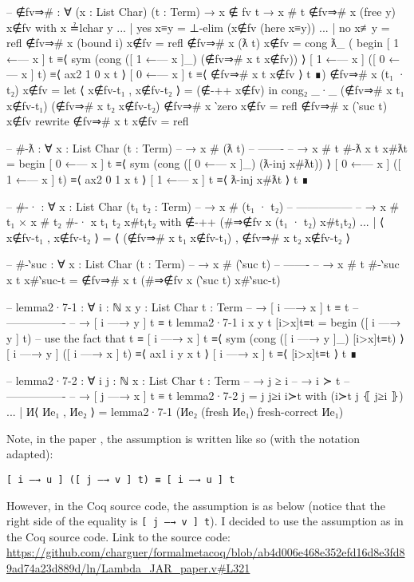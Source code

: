 \documentclass[logo,bsc,singlespacing,parskip,online]{infthesis}
\renewenvironment{code}{\mintedcopy[breaklines,breaksymbolleft=\;]{agda}}{\endmintedcopy}
\begin{document}
\begin{code}
-- ∉fv⇒# : ∀ (x : List Char) (t : Term) → x ∉ fv t → x # t
∉fv⇒# x (free y) x∉fv with x ≟lchar y
... | yes x≡y = ⊥-elim (x∉fv (here x≡y))
... | no  x≢y = refl
∉fv⇒# x (bound i) x∉fv = refl
∉fv⇒# x (ƛ t) x∉fv = cong ƛ_ (
  begin
    [ 1 ←— x ] t
  ≡⟨ sym (cong ([ 1 ←— x ]_) (∉fv⇒# x t x∉fv)) ⟩
    [ 1 ←— x ] ([ 0 ←— x ] t)
  ≡⟨ ax2 1 0 x t ⟩
    [ 0 ←— x ] t
  ≡⟨ ∉fv⇒# x t x∉fv ⟩
    t
  ∎)
∉fv⇒# x (t₁ · t₂) x∉fv = let ⟨ x∉fv-t₁ , x∉fv-t₂ ⟩ = (∉-++ x∉fv) in
  cong₂ _·_
    (∉fv⇒# x t₁ x∉fv-t₁)
    (∉fv⇒# x t₂ x∉fv-t₂)
∉fv⇒# x ‵zero x∉fv = refl
∉fv⇒# x (‵suc t) x∉fv rewrite ∉fv⇒# x t x∉fv = refl

-- #-ƛ : ∀ {x : List Char} (t : Term)
--   → x # (ƛ t)
--     -------
--   → x # t
#-ƛ {x} t x#ƛt =
  begin
    [ 0 ←— x ] t
  ≡⟨ sym (cong ([ 0 ←— x ]_) (ƛ-inj x#ƛt)) ⟩
    [ 0 ←— x ] ([ 1 ←— x ] t)
  ≡⟨ ax2 0 1 x t ⟩
    [ 1 ←— x ] t
  ≡⟨ ƛ-inj x#ƛt ⟩
    t
  ∎

-- #-· : ∀ {x : List Char} (t₁ t₂ : Term)
--   → x # (t₁ · t₂)
--     ---------------
--   → x # t₁ × x # t₂
#-· {x} t₁ t₂ x#t₁t₂ with ∉-++ (#⇒∉fv x (t₁ · t₂) x#t₁t₂)
... | ⟨ x∉fv-t₁ , x∉fv-t₂ ⟩ = ⟨ (∉fv⇒# x t₁ x∉fv-t₁) , ∉fv⇒# x t₂ x∉fv-t₂ ⟩

-- #-‵suc : ∀ {x : List Char} (t : Term)
--   → x # (‵suc t)
--     -------
--   → x # t
#-‵suc {x} t x#‵suc-t = ∉fv⇒# x t (#⇒∉fv x (‵suc t) x#‵suc-t)


-- lemma2·7-1 : ∀ {i : ℕ} {x y : List Char} {t : Term}
--   → [ i —→ x ] t ≡ t
--     ----------------
--   → [ i —→ y ] t ≡ t
lemma2·7-1 {i} {x} {y} {t} [i>x]t≡t = 
  begin
    ([ i —→ y ] t)
  -- use the fact that t ≡ [ i —→ x ] t
  ≡⟨ sym (cong ([ i —→ y ]_) [i>x]t≡t) ⟩
    [ i —→ y ] ([ i —→ x ] t)
  ≡⟨ ax1 i y x t ⟩
    [ i —→ x ] t
  ≡⟨ [i>x]t≡t ⟩
    t
  ∎

-- lemma2·7-2 : ∀ {i j : ℕ} {x : List Char} {t : Term}
--   → j ≥ i
--   → i ≻ t
--     ----------------
--   → [ j —→ x ] t ≡ t
lemma2·7-2 {j = j} j≥i i≻t with (i≻t j ⦃ j≥i ⦄)
... | И⟨ Иe₁ , Иe₂ ⟩ = lemma2·7-1 (Иe₂ (fresh Иe₁) {fresh-correct Иe₁})
\end{code}

Note, in the paper \citep{chargueraud_locally_2012}, the assumption is written like so (with the
notation adapted):

\texttt{[ i —→ u ] ([ j —→ v ] t) ≡ [ i —→ u ] t}

However, in the Coq source code, the assumption is as below (notice that the right side of the
equality is \texttt{[ j —→ v ] t}). I decided to use the assumption as in the Coq source code. Link
to the source code:
\url{https://github.com/charguer/formalmetacoq/blob/ab4d006e468e352efd16d8e3fd89ad74a23d889d/ln/Lambda_JAR_paper.v#L321}
\end{document}
